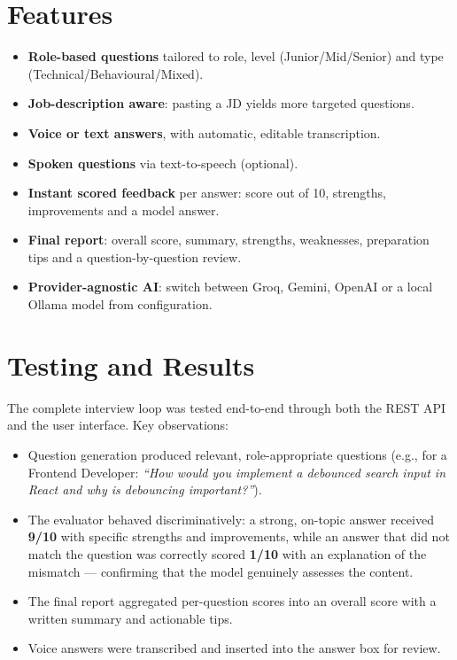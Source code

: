 \documentclass[11pt,a4paper]{article}
\begin{document}
\section{Features}
\begin{itemize}[leftmargin=1.4em]
  \item \textbf{Role-based questions} tailored to role, level (Junior/Mid/Senior) and
        type (Technical/Behavioural/Mixed).
  \item \textbf{Job-description aware}: pasting a JD yields more targeted questions.
  \item \textbf{Voice or text answers}, with automatic, editable transcription.
  \item \textbf{Spoken questions} via text-to-speech (optional).
  \item \textbf{Instant scored feedback} per answer: score out of 10, strengths,
        improvements and a model answer.
  \item \textbf{Final report}: overall score, summary, strengths, weaknesses,
        preparation tips and a question-by-question review.
  \item \textbf{Provider-agnostic AI}: switch between Groq, Gemini, OpenAI or a local
        Ollama model from configuration.
\end{itemize}

\section{Testing and Results}
The complete interview loop was tested end-to-end through both the REST API and the
user interface. Key observations:
\begin{itemize}[leftmargin=1.4em]
  \item Question generation produced relevant, role-appropriate questions
        (e.g., for a Frontend Developer: \emph{``How would you implement a debounced
        search input in React and why is debouncing important?''}).
  \item The evaluator behaved discriminatively: a strong, on-topic answer received
        \textbf{9/10} with specific strengths and improvements, while an answer that did
        not match the question was correctly scored \textbf{1/10} with an explanation of
        the mismatch --- confirming that the model genuinely assesses the content.
  \item The final report aggregated per-question scores into an overall score with a
        written summary and actionable tips.
  \item Voice answers were transcribed and inserted into the answer box for review.
\end{itemize}
\end{document}
